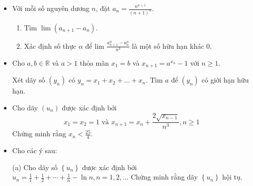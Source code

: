 \documentclass[11pt]{scrartcl}
\begin{document}
\begin{itemize}[label=, leftmargin=0em, itemsep=-0em]
\begin{btvn}
    \end{btvn}
    \item\begin{btvn}
        Với mỗi số nguyên dương $n$, đặt $a_n=\frac{n^{n+1}}{(n+1)^n}$.
        \begin{enumerate}[label=(\alph*)]
            \item Tìm $\lim \left(a_{n+1}-a_n\right)$.
            \item Xác định số thực $\alpha$ để lim $\frac{a_{n+1}^\alpha-a_n^\alpha}{n^2}$ là một số hữu hạn khác 0.
        \end{enumerate}
    \end{btvn}
    \item \begin{btvn}
        Cho $a,b \in \mathbb{R}$ và $a > 1$ thỏa mãn $x_1 = b$ và $x_{n + 1}= a^{x_n} - 1$ với $n \geq 1$.
        
        Xét dãy số $(y_n)$ có $y_n = x_1 + x_2 +\dots+ x_n$. Tìm $a$ để $(y_n)$ có giới hạn hữu hạn.
    \end{btvn}
    \item \begin{btvn}
        Cho dãy $(u_n)$ được xác định bởi
        \[
            x_1 = x_2 = 1 \text{ và }x_{n + 1} = x_n + \frac{2\sqrt{x_{n - 1}}}{n^3}, n \geq 1
        \]
        Chứng minh rằng $x_n < \frac{25}{4}$.
    \end{btvn}
    \item \begin{btvn} Cho các ý sau:
    

        (a) Cho dãy số $\left\{u_n\right\}$ được xác định bởi $u_n=\frac{1}{1}+\frac{1}{2}+\cdots+\frac{1}{n}-\ln n, n=1,2, \ldots$ Chứng minh rằng dãy $\left\{u_n\right\}$ hội tụ.



\end{btvn}
\end{itemize}
\end{document}
